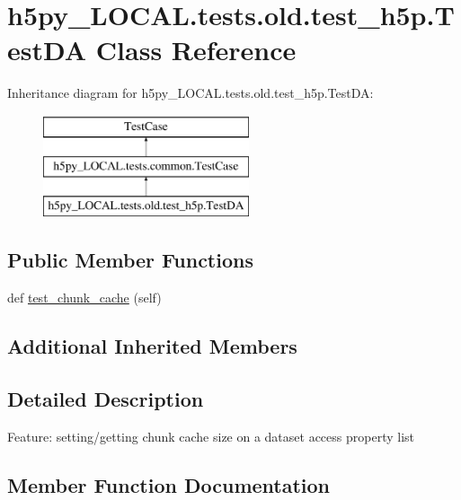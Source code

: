 \hypertarget{classh5py__LOCAL_1_1tests_1_1old_1_1test__h5p_1_1TestDA}{}\section{h5py\+\_\+\+L\+O\+C\+A\+L.\+tests.\+old.\+test\+\_\+h5p.\+Test\+DA Class Reference}
\label{classh5py__LOCAL_1_1tests_1_1old_1_1test__h5p_1_1TestDA}
Inheritance diagram for h5py\+\_\+\+L\+O\+C\+A\+L.\+tests.\+old.\+test\+\_\+h5p.\+Test\+DA\+:\begin{figure}[H]
\begin{center}
\leavevmode
\includegraphics[height=3.000000cm]{classh5py__LOCAL_1_1tests_1_1old_1_1test__h5p_1_1TestDA}
\end{center}
\end{figure}
\subsection*{Public Member Functions}
\begin{DoxyCompactItemize}
\item 
def \hyperlink{classh5py__LOCAL_1_1tests_1_1old_1_1test__h5p_1_1TestDA_afaf2d160e5b740671ec7d08cd5c1032f}{test\+\_\+chunk\+\_\+cache} (self)
\end{DoxyCompactItemize}
\subsection*{Additional Inherited Members}


\subsection{Detailed Description}
\begin{DoxyVerb}Feature: setting/getting chunk cache size on a dataset access property list
\end{DoxyVerb}
 

\subsection{Member Function Documentation}
\mbox{\label{classh5py__LOCAL_1_1tests_1_1old_1_1test__h5p_1_1TestDA_afaf2d160e5b740671ec7d08cd5c1032f}} 
